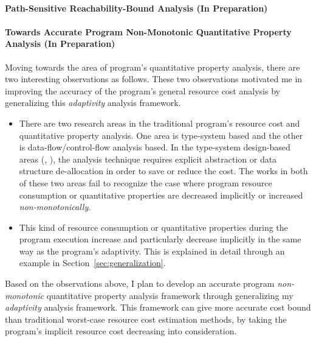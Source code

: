 \paragraph{Path-Sensitive Reachability-Bound Analysis (In Preparation)}
\label{sec:intro-reachability}

\paragraph{Towards Accurate Program Non-Monotonic Quantitative Property Analysis (In Preparation)}
\label{sec:intro-cost}
Moving towards the area of program's quantitative property analysis,
there are two interesting observations as follows.
These two observations motivated me in 
improving the accuracy of the program's general resource cost analysis
by generalizing this \emph{adaptivity} analysis framework.
\begin{itemize}
 \item 
 There are two research areas in the traditional program's resource cost and quantitative property analysis.
One area is type-system based and the other is data-flow/control-flow analysis based. 
In the type-system design-based areas (\cite{GustafssonEL05}, \cite{hoffmann_jost_2022}), 
the analysis technique requires explicit abstraction or data structure de-allocation in order to save or reduce the cost.
 The
 works in both of these two areas fail to recognize the case where program resource consumption or quantitative properties 
 are decreased implicitly or increased \emph{non-monotonically}.
 \item This kind of resource consumption or quantitative properties during the program 
 execution increase and particularly decrease implicitly in the same way as the program's adaptivity. 
 This is explained in detail through an example in Section~\ref*{sec:generalization}.
\end{itemize}
 Based on the observations above, 
 I plan to develop
 an accurate program \emph{non-monotonic} quantitative property analysis framework through generalizing 
 my \emph{adaptivity} analysis framework.
 This framework can give more accurate cost bound than traditional worst-case resource cost estimation methods,
 by taking the program's implicit resource cost decreasing into consideration.

